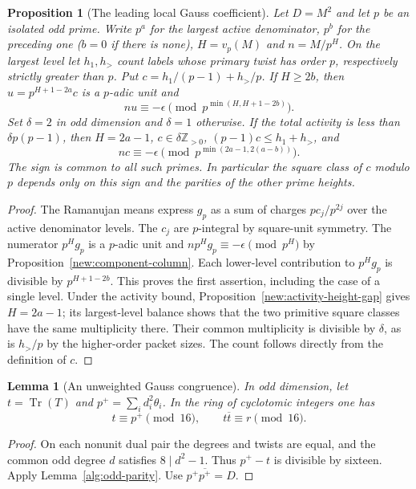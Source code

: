 \documentclass[11pt]{amsart}
\numberwithin{equation}{section}
\newtheorem{lemma}[theorem]{Lemma}
\newtheorem{proposition}[theorem]{Proposition}
\theoremstyle{definition}
\theoremstyle{plain}
\begin{document}
\begin{proposition}[The leading local Gauss coefficient]\label{new:leading-gauss}
Let $D=M^2$ and let $p$ be an isolated odd prime. Write $p^a$ for the
largest active denominator, $p^b$ for the preceding one ($b=0$ if
there is none), $H=v_p(M)$ and $n=M/p^H$. On the largest level let
$h_1,h_>$ count labels whose primary twist has order $p$, respectively
strictly greater than $p$. Put $c=h_1/(p-1)+h_>/p$. If $H\ge 2b$,
then $u=p^{H+1-2a}c$ is a $p$-adic unit and
\[
                  nu\equiv-\epsilon
          \pmod {p^{\min(H,H+1-2b)}} .
\]
Set $\delta=2$ in odd dimension and $\delta=1$ otherwise.
If the total activity is less than $\delta p(p-1)$, then
$H=2a-1$, $c\in\delta\mathbb Z_{>0}$, $(p-1)c\le h_1+h_>$, and
\[
            n c\equiv-\epsilon
         \pmod {p^{\min(2a-1,2(a-b))}}.
\]
The sign is common to all such primes. In particular the square class
of $c$ modulo $p$ depends only on this sign and the parities of the
other prime heights.
\end{proposition}
\begin{proof}
The Ramanujan means express $g_p$ as a sum of charges $p c_j/p^{2j}$
over the active denominator levels. The $c_j$ are $p$-integral by
square-unit symmetry. The numerator $p^H g_p$ is a $p$-adic unit and
$n p^H g_p\equiv-\epsilon\pmod {p^H}$ by
Proposition~\ref{new:component-column}. Each lower-level contribution
to $p^H g_p$ is divisible by $p^{H+1-2b}$. This proves the first
assertion, including the case of a single level. Under the activity
bound, Proposition~\ref{new:activity-height-gap} gives $H=2a-1$;
its largest-level balance shows that the two primitive square classes
have the same multiplicity there. Their common multiplicity is
divisible by $\delta$, as is $h_>/p$ by the higher-order packet sizes.
The count follows directly from the definition of $c$.
\end{proof}

\begin{lemma}[An unweighted Gauss congruence]\label{new:dyadic-trace}
In odd dimension, let $t=\operatorname{Tr}(T)$ and
$p^+=\sum_i d_i^2\theta_i$. In the ring of cyclotomic integers one has
\[
 t\equiv p^+\pmod {16},\qquad
                  t\overline{t}\equiv r\pmod {16}.
\]
\end{lemma}
\begin{proof}
On each nonunit dual pair the degrees and twists are equal, and the
common odd degree $d$ satisfies $8\mid d^2-1$. Thus $p^+-t$ is divisible by sixteen. Apply Lemma~\ref{alg:odd-parity}.
Use $p^+\overline{p^+}=D$.
\end{proof}
\end{document}
